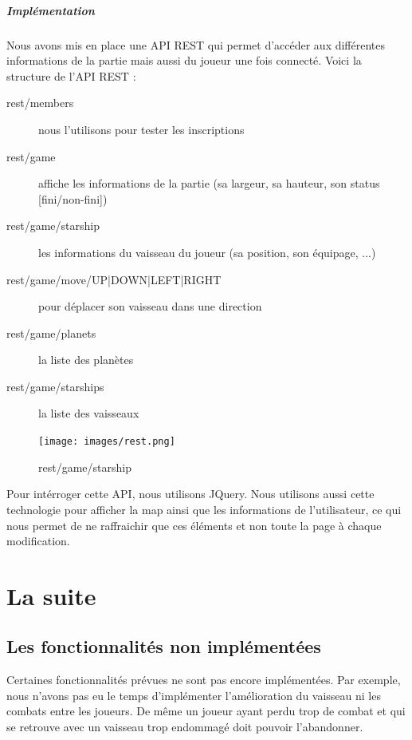 \documentclass[a4paper,11pt]{report}
\begin{document}
      \paragraph{Implémentation}
        Nous avons mis en place une API REST qui permet d'accéder aux différentes informations de la partie mais aussi du joueur une fois connecté. Voici la structure de l'API REST :
        \begin{description}
          \item[rest/members] nous l'utilisons pour tester les inscriptions
          \item[rest/game] affiche les informations de la partie (sa largeur, sa hauteur, son status [fini/non-fini])
          \item[rest/game/starship] les informations du vaisseau du joueur (sa position, son équipage, ...)
          \item[rest/game/move/{UP|DOWN|LEFT|RIGHT}] pour déplacer son vaisseau dans une direction
          \item[rest/game/planets] la liste des planètes
          \item[rest/game/starships] la liste des vaisseaux
        \end{description}
        \begin{figure}[H]
          \begin{center}
            \texttt{[image: images/rest.png]}
            \caption{rest/game/starship}
            \label{fig:rest_starship}
          \end{center}
        \end{figure}
        Pour intérroger cette API, nous utilisons JQuery. Nous utilisons aussi cette technologie pour afficher la map ainsi que les informations de l'utilisateur, ce qui nous permet de ne raffraichir que ces éléments et non toute la page à chaque modification.

\chapter{La suite}

  \section{Les fonctionnalités non implémentées}
    Certaines fonctionnalités prévues ne sont pas encore implémentées. 
    Par exemple, nous n'avons pas eu le temps d'implémenter l'amélioration du vaisseau ni les combats entre les joueurs.
    De même un joueur ayant perdu trop de combat et qui se retrouve avec un vaisseau trop endommagé doit pouvoir l'abandonner.
    
\end{document}
